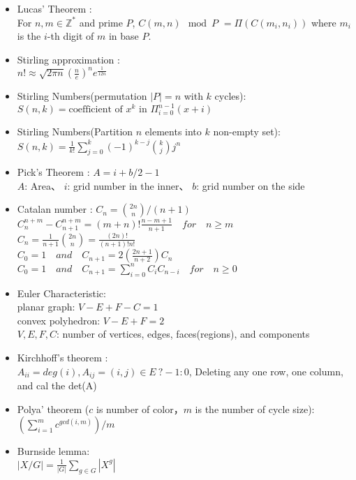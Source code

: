\begin{itemize}
\item Lucas’ Theorem :\\
  For $n, m \in \mathbb{Z}^{*}$ and prime $P$,
  $C(m,n) \mod P$
	$= \Pi ( C(m_i,n_i) )$
  where $m_i$ is the $i$-th digit of $m$ in base $P$.
\item Stirling approximation : \\
  $n!\approx\sqrt{ 2 \pi n}(\frac{n}{e})^{n}e^\frac{1}{12n}$
\item Stirling Numbers(permutation $|P|=n$ with $k$ cycles): \\
  $S(n,k) = \text{coefficient of }x^k \text{ in } \Pi_{i=0}^{n-1} (x+i)$
\item Stirling Numbers(Partition $n$ elements into $k$ non-empty set): \\
  $S(n,k) = \frac{1}{k!} \sum\limits_{j=0}^k (-1)^{k-j} {k \choose j} j^n$
\item Pick’s Theorem : $A = i + b/2 - 1$\\
  $A$: Area、 $i$: grid number in the inner、 $b$: grid number on the side
\item Catalan number : $C_n = {2n \choose n}/(n+1)$\\
  $C^{n+m}_{n}-C^{n+m}_{n+1} = (m+n)! \frac{n-m+1}{n+1}\quad for \quad  n \ge m$\\
  $C_n = \frac{1}{n+1}{2n \choose n} = \frac{(2n)!}{(n+1)!n!}$\\
  $C_0 = 1 \quad  and \quad C_{n+1}= 2(\frac{2n+1}{n+2})C_n$\\
  $C_0 = 1 \quad  and \quad C_{n+1} = \sum_{i=0}^{n} C_iC_{n-i} \quad for \quad  n \ge 0$
\item Euler Characteristic: \\
  planar graph: $V-E+F-C=1$ \\
  convex polyhedron: $V-E+F=2$ \\
  $V,E,F,C$: number of vertices, edges, faces(regions), and components
\item Kirchhoff's theorem : \\
  $A_{ii} = deg(i), A_{ij} = (i,j) \in E\ ? -1 : 0$,
  Deleting any one row, one column, and cal the det(A)
\item Polya' theorem ($c$ is number of color，$m$ is the number of cycle size): \\
  $(\sum_{i=1}^{m}{c^{gcd(i,m)}})/m$
\item Burnside lemma: \\
  $|X/G| = \frac{1}{|G|}\sum\limits_{g\in G} |X^g|$

\end{itemize}

